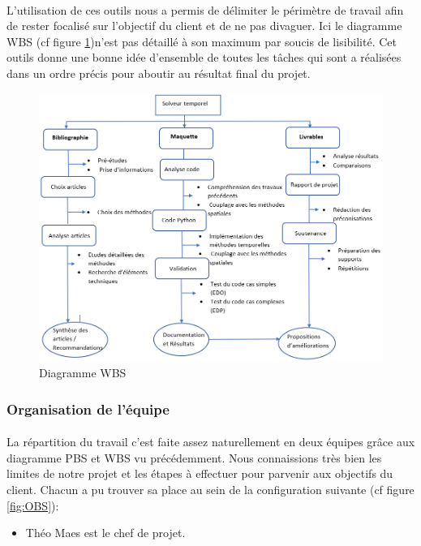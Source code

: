     \paragraph{}
    L'utilisation de ces outils nous a permis de délimiter le périmètre de travail afin de rester focalisé sur l'objectif du client et de ne pas divaguer. Ici le diagramme WBS (cf figure \ref{WBS})n'est pas détaillé à son maximum par soucis de lisibilité. Cet outils donne une bonne idée d'ensemble de toutes les tâches qui sont a réalisées dans un ordre précis pour aboutir au résultat final du projet. 
    \begin{figure}[h!]
        \centering
        \includegraphics[width=1\textwidth]{images/Vrai_WBS.PNG}
        \caption{Diagramme WBS}
        \label{WBS}
    \end{figure}
\newpage 
    \subsubsection{Organisation de l'équipe}
    \paragraph{}
    La répartition du travail c'est faite assez naturellement en deux équipes grâce aux diagramme PBS et WBS vu précédemment. Nous connaissions très bien les limites de notre projet et les étapes à effectuer pour parvenir aux objectifs du client. Chacun a pu trouver sa place au sein de la configuration suivante (cf figure \ref{fig:OBS}):
    \begin{itemize}
        \item Théo Maes est le chef de projet. 
    \end{itemize}
